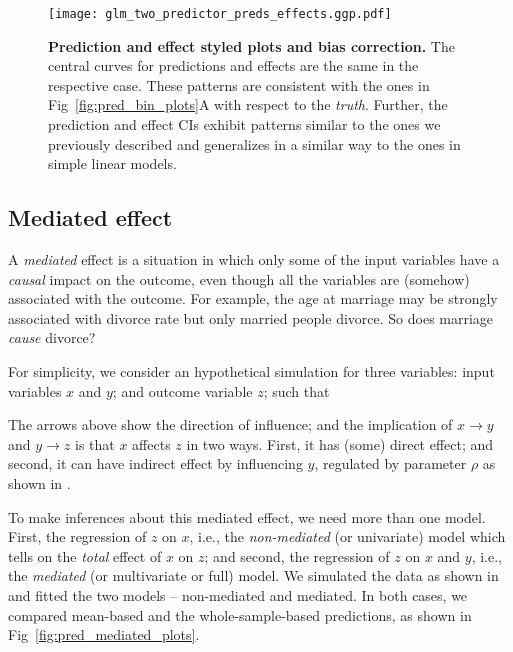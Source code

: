 \begin{figure}
\begin{center}
\texttt{[image: glm\_two\_predictor\_preds\_effects.ggp.pdf]}
\end{center}
\caption{{\bf Prediction and effect styled plots and bias correction.} The central curves for predictions and effects are the same in the respective case. These patterns are  consistent with the ones in Fig~\ref{fig:pred_bin_plots}A with respect to the \emph{truth}. Further, the prediction and effect CIs exhibit patterns similar to the ones we previously described and generalizes in a similar way to the ones in simple linear models.
}
\label{fig:pred_bin_prediction_effects_plots}
\end{figure}


\subsection{Mediated effect}

A \emph{mediated} effect is a situation in which only some of the input variables have a \emph{causal} impact on the outcome, even though all the variables are (somehow) associated with the outcome. For example, the age at marriage may be strongly associated with divorce rate but only married people divorce. So does marriage \emph{cause} divorce?

For simplicity, we consider an hypothetical simulation for three variables: input variables $x$ and $y$; and outcome variable $z$; such that
%
\begin{center}
\end{center}
%
The arrows above show the direction of influence; and the implication of $x\rightarrow y$ and $y \rightarrow z$ is that $x$ affects $z$ in two ways. First, it has (some) direct effect; and second, it can have indirect effect by influencing $y$, regulated by parameter $\rho$ as shown in .

To make inferences about this mediated effect, we need more than one model. First, the regression of $z$ on $x$, i.e., the \emph{non-mediated} (or univariate) model which tells on the \emph{total} effect of $x$ on $z$; and second, the regression of $z$ on $x$ and $y$, i.e., the \emph{mediated} (or multivariate or full) model. We simulated the data as shown in  and fitted the two models -- non-mediated and mediated. In both cases, we compared mean-based and the whole-sample-based predictions, as shown in Fig~\ref{fig:pred_mediated_plots}.

